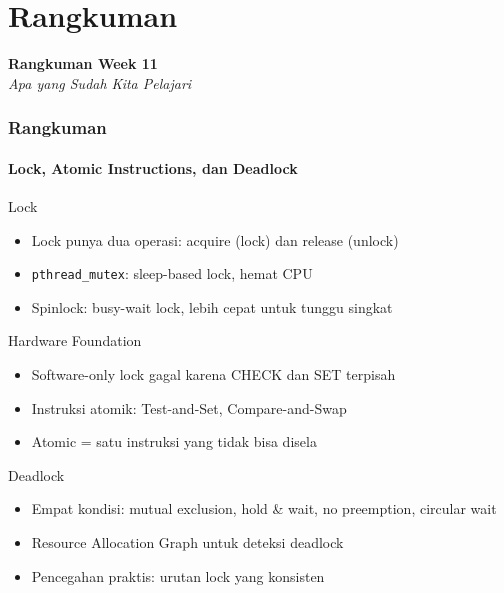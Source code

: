 \documentclass[t,aspectratio=169,xcolor=dvipsnames]{beamer}
\begin{document}
\section{Rangkuman}

\begin{frame}[plain]
    \begin{center}
        \vspace{3cm}
        \Huge\textbf{Rangkuman Week 11}\\[0.4em]
        \Large\textit{Apa yang Sudah Kita Pelajari}
    \end{center}
\end{frame}

\begin{frame}
    \frametitle{Rangkuman}
    \framesubtitle{Lock, Atomic Instructions, dan Deadlock}
    \small

    \begin{block}{Lock}
        \begin{itemize}
            \item Lock punya dua operasi: acquire (lock) dan release (unlock)
            \item \texttt{pthread\_mutex}: sleep-based lock, hemat CPU
            \item Spinlock: busy-wait lock, lebih cepat untuk tunggu singkat
        \end{itemize}
    \end{block}

    \begin{block}{Hardware Foundation}
        \begin{itemize}
            \item Software-only lock gagal karena CHECK dan SET terpisah
            \item Instruksi atomik: Test-and-Set, Compare-and-Swap
            \item Atomic = satu instruksi yang tidak bisa disela
        \end{itemize}
    \end{block}

    \begin{block}{Deadlock}
        \begin{itemize}
            \item Empat kondisi: mutual exclusion, hold \& wait, no preemption, circular wait
            \item Resource Allocation Graph untuk deteksi deadlock
            \item Pencegahan praktis: urutan lock yang konsisten
        \end{itemize}
    \end{block}
\end{frame}
\end{document}
